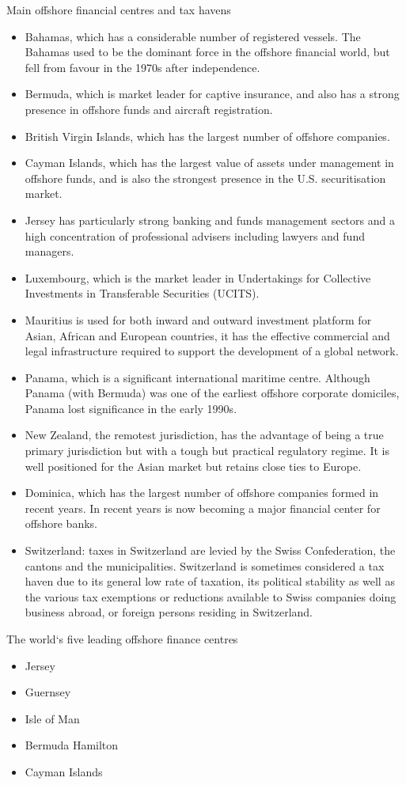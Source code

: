 \documentclass[international_finance_p2.tex]{subfiles}
\begin{document}
\begin{frame}[allowframebreaks]{Main offshore financial centres and tax havens}
\begin{itemize}
\item
Bahamas, which has a considerable number of registered vessels. The Bahamas used to be the dominant force in the offshore financial world, but fell from favour in the 1970s after independence.
\item
Bermuda, which is market leader for captive insurance, and also has a strong presence in offshore funds and aircraft registration.
\item
British Virgin Islands, which has the largest number of offshore companies.
\item
Cayman Islands, which has the largest value of assets under management in offshore funds, and is also the strongest presence in the U.S. securitisation market.
\pagebreak
\item
Jersey has particularly strong banking and funds management sectors and a high concentration of professional advisers including lawyers and fund managers.
\item
Luxembourg, which is the market leader in Undertakings for Collective Investments in Transferable Securities (UCITS).
\item
Mauritius is used for both inward and outward investment platform for Asian, African and European countries, it has the effective commercial and legal infrastructure required to support the development of a global network. 
\pagebreak
\item
Panama, which is a significant international maritime centre. Although Panama (with Bermuda) was one of the earliest offshore corporate domiciles, Panama lost significance in the early 1990s.
\item
New Zealand, the remotest jurisdiction, has the advantage of being a true primary jurisdiction but with a tough but practical regulatory regime. It is well positioned for the Asian market but retains close ties to Europe.
\item
Dominica, which has the largest number of offshore companies formed in recent years. In recent years is now becoming a major financial center for offshore banks.
\item
Switzerland: taxes in Switzerland are levied by the Swiss Confederation, the cantons and the municipalities. Switzerland is sometimes considered a tax haven due to its general low rate of taxation, its political stability as well as the various tax exemptions or reductions available to Swiss companies doing business abroad, or foreign persons residing in Switzerland.
\end{itemize}
\end{frame}
\begin{frame}{The world`s five leading offshore finance centres}
\begin{itemize}
\item
Jersey
\item
Guernsey
\item
Isle of Man
\item
Bermuda Hamilton
\item
Cayman Islands
\end{itemize}
\end{frame}
\end{document}
